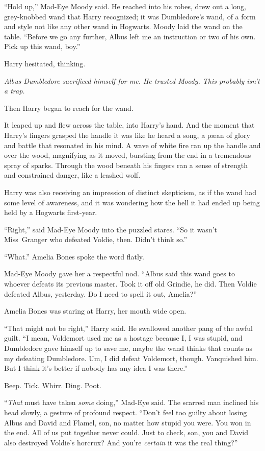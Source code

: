“Hold up,” Mad-Eye Moody said. He reached into his robes, drew out a long, grey-knobbed wand that Harry recognized; it was Dumbledore’s wand, of a form and style not like any other wand in Hogwarts. Moody laid the wand on the table. “Before we go any further, Albus left me an instruction or two of his own. Pick up this wand, boy.”

Harry hesitated, thinking.

\emph{Albus Dumbledore sacrificed himself for me. He trusted Moody. This probably isn’t a trap.}

Then Harry began to reach for the wand.

It leaped up and flew across the table, into Harry’s hand. And the moment that Harry’s fingers grasped the handle it was like he heard a song, a pæan of glory and battle that resonated in his mind. A wave of white fire ran up the handle and over the wood, magnifying as it moved, bursting from the end in a tremendous spray of sparks. Through the wood beneath his fingers ran a sense of strength and constrained danger, like a leashed wolf.

Harry was also receiving an impression of distinct skepticism, as if the wand had some level of awareness, and it was wondering how the hell it had ended up being held by a Hogwarts first-year.

“Right,” said Mad-Eye Moody into the puzzled stares. “So it wasn’t Miss~Granger who defeated Voldie, then. Didn’t think so.”

“What.” Amelia Bones spoke the word flatly.

Mad-Eye Moody gave her a respectful nod. “Albus said this wand goes to whoever defeats its previous master. Took it off old Grindie, he did. Then Voldie defeated Albus, yesterday. Do I need to spell it out, Amelia?”

Amelia Bones was staring at Harry, her mouth wide open.

“That might not be right,” Harry said. He swallowed another pang of the awful guilt. “I mean, Voldemort used me as a hostage because I, I was stupid, and Dumbledore gave himself up to save me, maybe the wand thinks that counts as my defeating Dumbledore. Um, I did defeat Voldemort, though. Vanquished him. But I think it’s better if nobody has any idea I was there.”

Beep. Tick. Whirr. Ding. Poot.

“\emph{That} must have taken \emph{some} doing,” Mad-Eye said. The scarred man inclined his head slowly, a gesture of profound respect. “Don’t feel too guilty about losing Albus and David and Flamel, son, no matter how stupid you were. You won in the end. All of us put together never could. Just to check, son, you and David also destroyed Voldie’s horcrux? And you’re \emph{certain} it was the real thing?”

